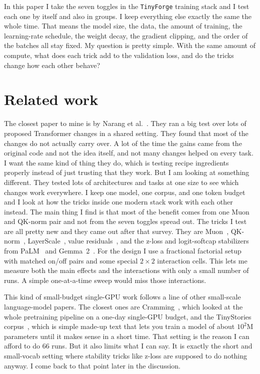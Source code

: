 \documentclass[11pt]{article}
\begin{document}
In this paper I take the seven toggles in the \texttt{TinyForge} training stack
and I test each one by itself and also in groups. I keep everything else exactly
the same the whole time. That means the model size, the data, the amount of
training, the learning-rate schedule, the weight decay, the gradient clipping,
and the order of the batches all stay fixed. My question is pretty simple. With
the same amount of compute, what does each trick add to the validation loss, and
do the tricks change how each other behave?

\section{Related work}

The closest paper to mine is by Narang et al.~\cite{narang2021transfer}. They ran
a big test over lots of proposed Transformer changes in a shared setting. They
found that most of the changes do not actually carry over. A lot of the time the
gains came from the original code and not the idea itself, and not many changes
helped on every task. I want the same kind of thing they do, which is testing
recipe ingredients properly instead of just trusting that they work. But I am
looking at something different. They tested lots of architectures and tasks at one
size to see which changes work everywhere. I keep one model, one corpus, and one
token budget and I look at how the tricks inside one modern stack work with each
other instead. The main thing I find is that most of the benefit comes from one
Muon and QK-norm pair and not from the seven toggles spread out. The tricks I test
are all pretty new and they came out after that survey. They are
Muon~\cite{jordan2024muon}, QK-norm~\cite{henry2020qknorm},
LayerScale~\cite{touvron2021cait}, value residuals~\cite{zhou2024resformer}, and
the z-loss and logit-softcap stabilizers from PaLM~\cite{chowdhery2023palm} and
Gemma~2~\cite{gemma2}. For the design I use a fractional factorial setup with
matched on/off pairs and some special $2\times2$ interaction cells. This lets me
measure both the main effects and the interactions with only a small number of
runs. A simple one-at-a-time sweep would miss those interactions.

This kind of small-budget single-GPU work follows a line of other small-scale
language-model papers. The closest ones are Cramming~\cite{geiping2023cramming},
which looked at the whole pretraining pipeline on a one-day single-GPU budget, and
the TinyStories corpus~\cite{eldan2023tinystories}, which is simple made-up text
that lets you train a model of about $10^2$M parameters until it makes sense in a
short time. That setting is the reason I can afford to do 66 runs. But it also
limits what I can say. It is exactly the short and small-vocab setting where
stability tricks like z-loss are supposed to do nothing anyway. I come back to
that point later in the discussion.
\end{document}
